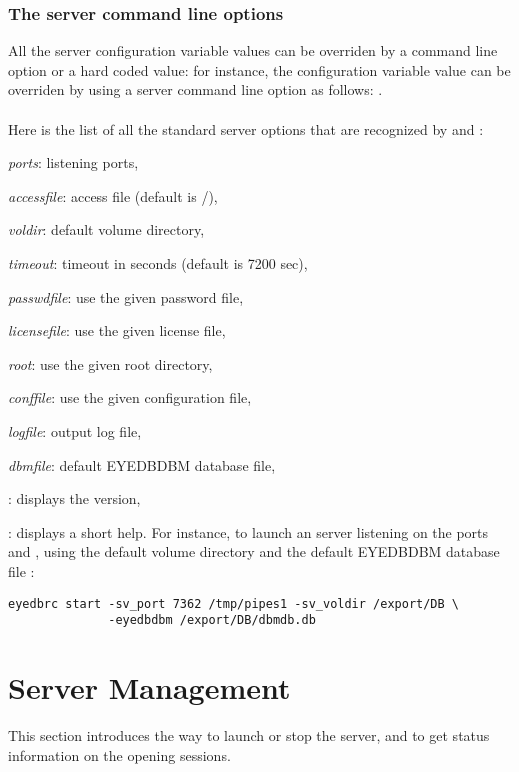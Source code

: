 \subsubsection{The server command line options}
All the server configuration variable values can be overriden by a command line
option or a hard coded value: for instance, the  configuration
variable value can be overriden by using a server command line option
as follows:
.
\\
\\
Here is the list of all the standard server options that are recognized
by  and :
\bi
\item {} \emph{ports}:  listening ports,
\item {} \emph{accessfile}: access file (default is \tdir/),
\item {} \emph{voldir}: default volume directory,
\item {} \emph{timeout}: timeout in seconds (default is 7200 sec),
\item {} \emph{passwdfile}: use the given password file,
\item {} \emph{licensefile}: use the given license file,
\item {} \emph{root}: use the given \eyedb root directory,
\item {} \emph{conffile}: use the given configuration file,
\item {} \emph{logfile}: output log file,
\item {} \emph{dbmfile}: default EYEDBDBM database file,
\item {}: displays the \eyedb version,
\item {}: displays a short help.
\ei
For instance, to launch an \eyedb server listening on the ports  and
, using the default volume directory 
and the default EYEDBDBM database file :
\begin{verbatim}
eyedbrc start -sv_port 7362 /tmp/pipes1 -sv_voldir /export/DB \
              -eyedbdbm /export/DB/dbmdb.db
\end{verbatim}

\section{Server Management}
This section introduces the way to launch or stop the server, and to
get status information on the opening sessions.
